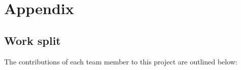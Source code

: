 \documentclass{article}
\begin{document}
\section{Appendix}

\subsection{Work split} %
\label{appendix:work_split} %

The contributions of each team member to this project are outlined below:

\begin{center}
    \newlength{\membercolwidthB} %
    \newlength{\contribcolwidthB}
    \setlength{\membercolwidthB}{0.25\linewidth} %
    \setlength{\contribcolwidthB}{\dimexpr\linewidth-\membercolwidthB-2\tabcolsep\relax}


\end{center}
\end{document}
